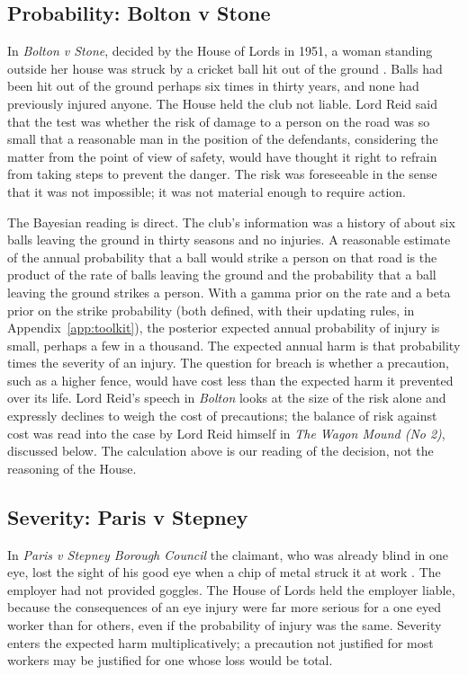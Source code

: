 \subsection{Probability: Bolton v Stone}

In \emph{Bolton v Stone}, decided by the House of Lords in 1951, a woman standing outside her house was struck by a cricket ball hit out of the ground \citep{bolton1951}. Balls had been hit out of the ground perhaps six times in thirty years, and none had previously injured anyone. The House held the club not liable. Lord Reid said that the test was whether the risk of damage to a person on the road was so small that a reasonable man in the position of the defendants, considering the matter from the point of view of safety, would have thought it right to refrain from taking steps to prevent the danger. The risk was foreseeable in the sense that it was not impossible; it was not material enough to require action.

The Bayesian reading is direct. The club's information was a history of about six balls leaving the ground in thirty seasons and no injuries. A reasonable estimate of the annual probability that a ball would strike a person on that road is the product of the rate of balls leaving the ground and the probability that a ball leaving the ground strikes a person. With a gamma prior on the rate and a beta prior on the strike probability (both defined, with their updating rules, in Appendix~\ref{app:toolkit}), the posterior expected annual probability of injury is small, perhaps a few in a thousand. The expected annual harm is that probability times the severity of an injury. The question for breach is whether a precaution, such as a higher fence, would have cost less than the expected harm it prevented over its life. Lord Reid's speech in \emph{Bolton} looks at the size of the risk alone and expressly declines to weigh the cost of precautions; the balance of risk against cost was read into the case by Lord Reid himself in \emph{The Wagon Mound (No 2)}, discussed below. The calculation above is our reading of the decision, not the reasoning of the House.

\subsection{Severity: Paris v Stepney}

In \emph{Paris v Stepney Borough Council} the claimant, who was already blind in one eye, lost the sight of his good eye when a chip of metal struck it at work \citep{paris1951}. The employer had not provided goggles. The House of Lords held the employer liable, because the consequences of an eye injury were far more serious for a one eyed worker than for others, even if the probability of injury was the same. Severity enters the expected harm multiplicatively; a precaution not justified for most workers may be justified for one whose loss would be total.

